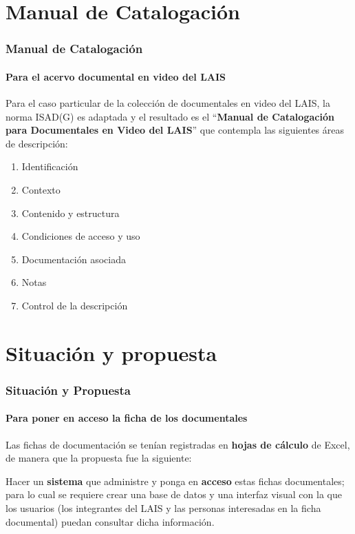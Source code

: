\documentclass{beamer}
\begin{document}
\section{Manual de Catalogación}
\begin{frame}
	\frametitle{Manual de Catalogación}
	\framesubtitle{Para el acervo documental en video del LAIS}
	
	Para el caso particular de la colección de documentales en video del LAIS, la norma ISAD(G) es adaptada y el resultado es el ``\textbf{Manual de Catalogación para Documentales en Video del LAIS}'' que contempla las siguientes áreas de descripción:
	
	\begin{enumerate}
		\item Identificación
		\item Contexto
		\item Contenido y estructura
		\item Condiciones de acceso y uso
		\item Documentación asociada
		\item Notas
		\item Control de la descripción
	\end{enumerate}
\end{frame}

\section{Situación y propuesta}
\begin{frame}
	\frametitle{Situación y Propuesta}
	\framesubtitle{Para poner en acceso la ficha de los documentales}
	
	Las fichas de documentación se tenían registradas en \textbf{hojas de cálculo} de Excel, de manera que la propuesta fue la siguiente:
	
	Hacer un \textbf{sistema} que administre y ponga en \textbf{acceso} estas fichas documentales; para lo cual se requiere crear una base de datos y una interfaz visual con la que los usuarios (los integrantes del LAIS y las personas interesadas en la ficha documental) puedan consultar dicha información.
\end{frame}
\end{document}
